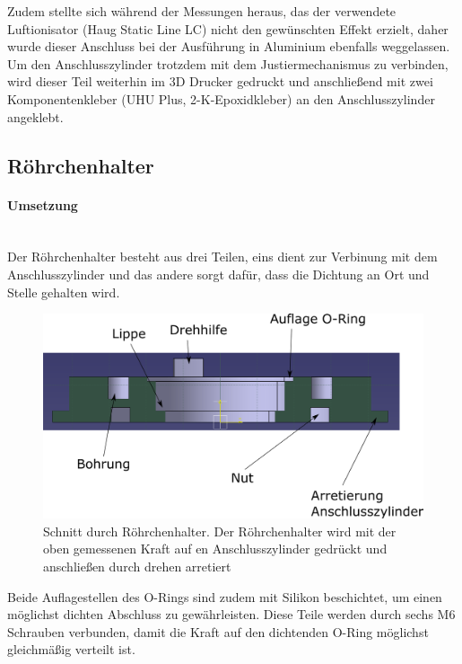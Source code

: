 Zudem stellte sich während der Messungen heraus, das der verwendete Luftionisator (Haug Static Line LC) nicht den gewünschten Effekt erzielt, daher wurde dieser Anschluss bei der Ausführung in Aluminium ebenfalls weggelassen. Um den Anschlusszylinder trotzdem mit dem Justiermechanismus zu verbinden, wird dieser Teil weiterhin im 3D Drucker gedruckt und anschließend mit zwei Komponentenkleber (UHU Plus, 2-K-Epoxidkleber) an den Anschlusszylinder angeklebt.

\newpage

\subsection{Röhrchenhalter}

\paragraph{Umsetzung}

\hfill \\

Der Röhrchenhalter besteht aus drei Teilen, eins dient zur Verbinung mit dem Anschlusszylinder und das andere sorgt dafür, dass die Dichtung an Ort und Stelle gehalten wird. 

\begin{figure}[h!]
	\begin{center}
		\includegraphics[scale=0.5]{Schnitt_Roehrchenhalter.png}
		\caption[Schnitt Röhrchenhalter]{Schnitt durch Röhrchenhalter. Der Röhrchenhalter wird mit der oben gemessenen Kraft auf en Anschlusszylinder gedrückt und anschließen durch drehen arretiert}
	\end{center}
\end{figure}

Beide Auflagestellen des O-Rings sind zudem mit Silikon beschichtet, um einen möglichst dichten Abschluss zu gewährleisten.
Diese Teile werden durch sechs M6 Schrauben verbunden, damit die Kraft auf den dichtenden O-Ring möglichst gleichmäßig verteilt ist. \\


